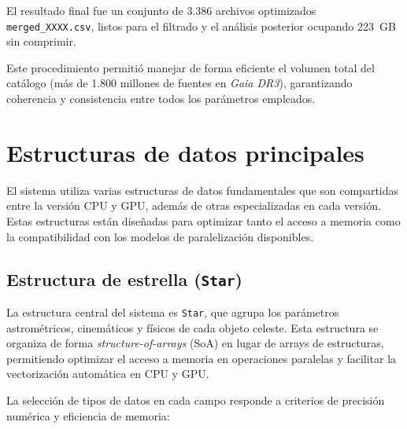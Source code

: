 El resultado final fue un conjunto de 3.386 archivos optimizados \texttt{merged\_XXXX.csv}, listos para el filtrado y el análisis posterior ocupando 223~GB sin comprimir.

Este procedimiento permitió manejar de forma eficiente el volumen total del catálogo (más de 1.800 millones de fuentes en \textit{Gaia DR3}), garantizando coherencia y consistencia entre todos los parámetros empleados.

\section{Estructuras de datos principales}\label{sec:estructuras}
El sistema utiliza varias estructuras de datos fundamentales que son compartidas entre la versión CPU y GPU, además de otras especializadas en cada versión.
Estas estructuras están diseñadas para optimizar tanto el acceso a memoria como la compatibilidad con los modelos de paralelización disponibles.

\subsection{Estructura de estrella (\texttt{Star})}\label{subsec:estructura-de-estrella-(texttt{star})}

La estructura central del sistema es \texttt{Star}, que agrupa los parámetros astrométricos, cinemáticos y físicos de cada objeto celeste.
Esta estructura se organiza de forma \textit{structure-of-arrays} (SoA) en lugar de arrays de estructuras, permitiendo optimizar el acceso a memoria en operaciones paralelas y facilitar la vectorización automática en CPU y GPU.

La selección de tipos de datos en cada campo responde a criterios de precisión numérica y eficiencia de memoria:

